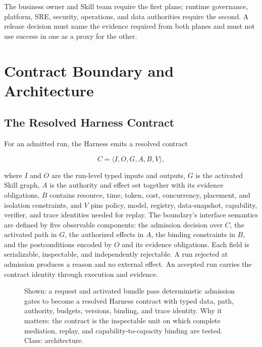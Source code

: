 The business owner and Skill team require the first plane; runtime governance, platform, SRE, security, operations, and data authorities require the second. A release decision must name the evidence required from both planes and must not use success in one as a proxy for the other.

\section{Contract Boundary and Architecture}
\label{sec:architecture}

\subsection{The Resolved Harness Contract}
\label{sec:harness-contract-def}

For an admitted run, the Harness emits a resolved contract

\begin{equation}
C=\langle I,O,G,A,B,V\rangle,
\end{equation}

where $I$ and $O$ are the run-level typed inputs and outputs, $G$ is the activated Skill graph, $A$ is the authority and effect set together with its evidence obligations, $B$ contains resource, time, token, cost, concurrency, placement, and isolation constraints, and $V$ pins policy, model, registry, data-snapshot, capability, verifier, and trace identities needed for replay. The boundary's interface semantics are defined by five observable components: the admission decision over $C$, the activated path in $G$, the authorized effects in $A$, the binding constraints in $B$, and the postconditions encoded by $O$ and its evidence obligations. Each field is serializable, inspectable, and independently rejectable. A run rejected at admission produces a reason and no external effect. An accepted run carries the contract identity through execution and evidence.

\begin{figure}[t]
\centering
\caption{Shown: a request and activated bundle pass deterministic admission gates to become a resolved Harness contract with typed data, path, authority, budgets, versions, binding, and trace identity. Why it matters: the contract is the inspectable unit on which complete mediation, replay, and capability-to-capacity binding are tested. Class: architecture.}
\label{fig:harness-contract}
\end{figure}

